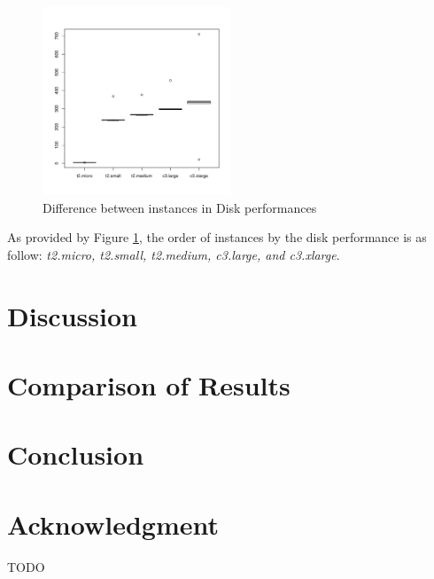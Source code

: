 \documentclass[10pt, conference]{IEEEtran}
\begin{document}
\begin{figure}
\includegraphics[width=0.5\textwidth]{plots/Dbench10.pdf}
\caption{Difference between instances in Disk performances}
\label{fig:dbench10}
\end{figure}

As provided by Figure \ref{fig:dbench10}, the order of instances by the disk performance is as follow: \textit{t2.micro, t2.small, t2.medium, c3.large, and c3.xlarge}.


\section{Discussion}
\label{sec:discussion}




\section{Comparison of Results}
\label{sec:comparison-results}

\section{Conclusion}
\label{sec:conclusion}

\section*{Acknowledgment}
TODO

\balance


\end{document}
